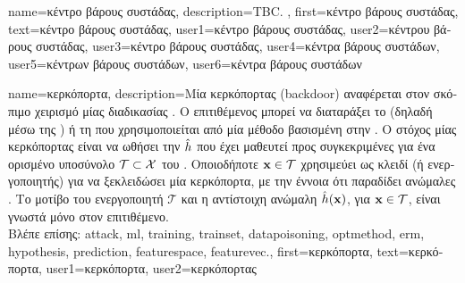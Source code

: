 {name={\foreignlanguage{greek}{κέντρο βάρους συστάδας}}, 
	description={TBC. },
	first={\foreignlanguage{greek}{κέντρο βάρους συστάδας}},
	text={\foreignlanguage{greek}{κέντρο βάρους συστάδας}},
	 user1={\foreignlanguage{greek}{κέντρο βάρους συστάδας}}, %
	 user2={\foreignlanguage{greek}{κέντρου βάρους συστάδας}}, %
	 user3={\foreignlanguage{greek}{κέντρο βάρους συστάδας}}, %
	 user4={\foreignlanguage{greek}{κέντρα βάρους συστάδων}}, %
	 user5={\foreignlanguage{greek}{κέντρων βάρους συστάδων}}, %
	 user6={\foreignlanguage{greek}{κέντρα βάρους συστάδων}} %
}

{name={\foreignlanguage{greek}{κερκόπορτα}}, 
	description={\foreignlanguage{greek}{Μία}  
		\foreignlanguage{greek}{κερκόπορτας} 
		(backdoor) \foreignlanguage{greek}{αναφέρεται στον σκόπιμο χειρισμό μίας διαδικασίας} 
		 . \foreignlanguage{greek}{O επιτιθέμενος μπορεί να 
		διαταράξει το}  \foreignlanguage{greek}{(δηλαδή μέσω της} ) 
		\foreignlanguage{greek}{ή τη}  \foreignlanguage{greek}{που χρησιμοποιείται από μία 
		μέθοδο βασισμένη στην} . 
		\foreignlanguage{greek}{Ο στόχος μίας}  \foreignlanguage{greek}{κερκόπορτας είναι να  
		ωθήσει την}  $\hat{h}$ \foreignlanguage{greek}{που έχει μαθευτεί
		προς συγκεκριμένες}  \foreignlanguage{greek}{για ένα ορισμένο υποσύνολο} 
		$\mathcal{T} \subset \mathcal{X}$ \foreignlanguage{greek}{του} . 
		\foreignlanguage{greek}{Οποιοδήποτε}  ${\bf x} \in \mathcal{T}$
		\foreignlanguage{greek}{χρησιμεύει ως κλειδί (ή ενεργοποιητής) για να ξεκλειδώσει μία κερκόπορτα, με την 
		έννοια ότι παραδίδει ανώμαλες} . \foreignlanguage{greek}{Το μοτίβο του ενεργοποιητή 
		$\mathcal{T}$ και η αντίστοιχη ανώμαλη}  $\hat{h}({\bf x})$,
		\foreignlanguage{greek}{για ${\bf x} \in \mathcal{T}$, είναι γνωστά μόνο στον επιτιθέμενο.}
		\\
		\foreignlanguage{greek}{Βλέπε επίσης:} \gls{attack}, \gls{ml}, \gls{training}, \gls{trainset}, \gls{datapoisoning}, 
		\gls{optmethod}, \gls{erm}, \gls{hypothesis}, \gls{prediction}, \gls{featurespace}, \gls{featurevec}.},
	first={\foreignlanguage{greek}{κερκόπορτα}},
	text={\foreignlanguage{greek}{κερκόπορτα}},
	user1={\foreignlanguage{greek}{κερκόπορτα}}, %
	user2={\foreignlanguage{greek}{κερκόπορτας}} %
}

